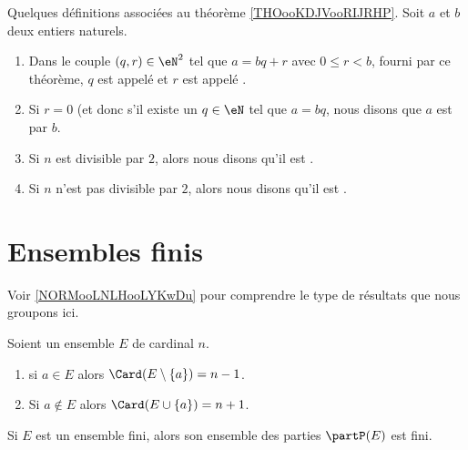 \begin{definition}	\label{DEFooDivisibleNombrePairImpair}
	Quelques définitions associées au théorème \ref{THOooKDJVooRIJRHP}. Soit \( a \) et \( b \) deux entiers naturels.
	\begin{enumerate}
		\item
		      Dans le couple \( (q,r)\in \eN^2\) tel que \( a=bq+r\) avec \( 0\leq r<b\), fourni par ce théorème, \( q \) est appelé  et \( r \) est appelé .
		\item
		      Si \( r=0\) (et donc s'il existe un \( q \in \eN\) tel que \( a = bq \), nous disons que \( a\) est  par \( b\).
		\item
		      Si \( n\) est divisible par \( 2\), alors nous disons qu'il est .
		\item\label{ITEMooDLHHooTmWSnN}
		      Si \( n\) n'est pas divisible par \( 2\), alors nous disons qu'il est .
	\end{enumerate}
\end{definition}



\section{Ensembles finis}

Voir \ref{NORMooLNLHooLYKwDu} pour comprendre le type de résultats que nous groupons ici.

\begin{lemma}	\label{LEMooKNKEooYQeDdo}
	Soient un ensemble \( E\) de cardinal \( n\).
	\begin{enumerate}
		\item
		      si \( a\in E\) alors \( \Card(E\setminus\{ a \})=n-1\).
		\item		\label{ITEMooLAECooBLOpwZ}
		      Si \( a\not\in E\) alors \( \Card(E\cup\{ a \})=n+1\).
	\end{enumerate}
\end{lemma}


\begin{lemma}	\label{LEMooNTVKooTfvHfA}
	Si \( E\) est un ensemble fini, alors son ensemble des parties \( \partP(E)\) est fini.
\end{lemma}

